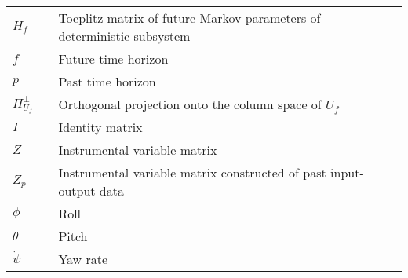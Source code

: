 {\begin{longtable}{lll}
$H_f$				&& Toeplitz matrix of future Markov parameters of deterministic subsystem\\
$f$					&& Future time horizon\\
$p$					&& Past time horizon\\
$\Pi_{U_f}^\perp$ 	&& Orthogonal projection onto the column space of $U_f$\\
$I$					&& Identity matrix\\
$Z$					&& Instrumental variable matrix\\
$Z_p$				&& Instrumental variable matrix constructed of past input-output data\\
$\phi$				&& Roll\\
$\theta$			&& Pitch\\
$\dot\psi$				&& Yaw rate\\
\end{longtable}

}